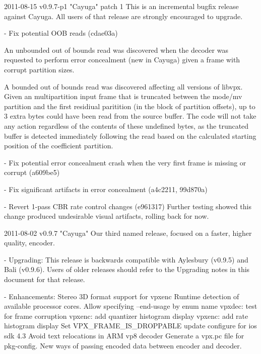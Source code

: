 \begin{DoxyVerbInclude}
2011-08-15 v0.9.7-p1 "Cayuga" patch 1
  This is an incremental bugfix release against Cayuga. All users of that
  release are strongly encouraged to upgrade.

    - Fix potential OOB reads (cdae03a)

          An unbounded out of bounds read was discovered when the
          decoder was requested to perform error concealment (new in
          Cayuga) given a frame with corrupt partition sizes.

          A bounded out of bounds read was discovered affecting all
          versions of libvpx. Given an multipartition input frame that
          is truncated between the mode/mv partition and the first
          residiual paritition (in the block of partition offsets), up
          to 3 extra bytes could have been read from the source buffer.
          The code will not take any action regardless of the contents
          of these undefined bytes, as the truncated buffer is detected
          immediately following the read based on the calculated
          starting position of the coefficient partition.

    - Fix potential error concealment crash when the very first frame
      is missing or corrupt (a609be5)

    - Fix significant artifacts in error concealment (a4c2211, 99d870a)

    - Revert 1-pass CBR rate control changes (e961317)
      Further testing showed this change produced undesirable visual
      artifacts, rolling back for now.


2011-08-02 v0.9.7 "Cayuga"
  Our third named release, focused on a faster, higher quality, encoder.

  - Upgrading:
    This release is backwards compatible with Aylesbury (v0.9.5) and
    Bali (v0.9.6). Users of older releases should refer to the Upgrading
    notes in this document for that release.

  - Enhancements:
          Stereo 3D format support for vpxenc
          Runtime detection of available processor cores.
          Allow specifying --end-usage by enum name
          vpxdec: test for frame corruption
          vpxenc: add quantizer histogram display
          vpxenc: add rate histogram display
          Set VPX_FRAME_IS_DROPPABLE
          update configure for ios sdk 4.3
          Avoid text relocations in ARM vp8 decoder
          Generate a vpx.pc file for pkg-config.
          New ways of passing encoded data between encoder and decoder.


\end{DoxyVerbInclude}
